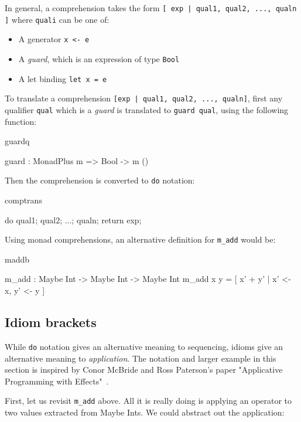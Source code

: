 \noindent
In general, a comprehension takes the form \texttt{[ exp | qual1, qual2, ..., qualn ]} where
\texttt{quali} can be one of:

\begin{itemize}
\item A generator \texttt{x <- e}
\item A \emph{guard}, which is an expression of type \texttt{Bool}
\item A let binding \texttt{let x = e}
\end{itemize}

\noindent
To translate a comprehension \texttt{[exp | qual1, qual2, ..., qualn]}, first
any qualifier
\texttt{qual} which is a \emph{guard} is translated to \texttt{guard qual}, using
the following function:

\begin{SaveVerbatim}{guardq}

guard : MonadPlus m => Bool -> m ()

\end{SaveVerbatim}

\noindent
Then the comprehension is converted to \texttt{do} notation:

\begin{SaveVerbatim}{comptrans}

do { qual1; qual2; ...; qualn; return exp; }

\end{SaveVerbatim}

\noindent
Using monad comprehensions, an alternative definition for \texttt{m\_add} would be:

\begin{SaveVerbatim}{maddb}

m_add : Maybe Int -> Maybe Int -> Maybe Int
m_add x y = [ x' + y' | x' <- x, y' <- y ]
\end{SaveVerbatim}

\subsection{Idiom brackets}

While \texttt{do} notation gives an alternative meaning to sequencing, idioms give an
alternative meaning to \emph{application}. The notation and larger example in this
section is inspired by Conor McBride and Ross Paterson's paper "Applicative
Programming with Effects"~\cite{idioms}.

First, let us revisit \texttt{m\_add} above. All it is really doing is applying
an operator to two values extracted from Maybe Ints. We could abstract out the
application:

